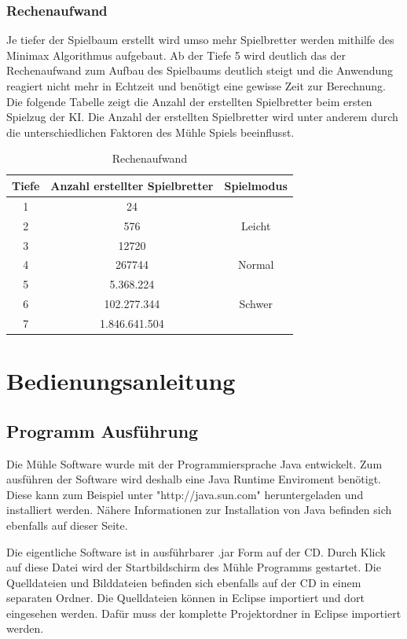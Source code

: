 \documentclass[oneside]{ausarbeitung}
\begin{document}
\subsection{Rechenaufwand}

Je tiefer der Spielbaum erstellt wird umso mehr Spielbretter werden mithilfe des Minimax Algorithmus aufgebaut. Ab der Tiefe 5 wird deutlich das der Rechenaufwand zum Aufbau des Spielbaums deutlich steigt und die Anwendung reagiert nicht mehr in Echtzeit und benötigt eine gewisse Zeit zur Berechnung. Die folgende Tabelle zeigt die Anzahl der erstellten Spielbretter beim ersten Spielzug der KI. Die Anzahl der erstellten Spielbretter wird unter anderem durch die unterschiedlichen Faktoren des Mühle Spiels beeinflusst. 

\begin{table}[H]
	\centering
	\renewcommand{\arraystretch}{2}
	\begin{tabular}{|c||c||c|}
	\hline
	Tiefe & Anzahl erstellter Spielbretter & Spielmodus \\ \hline \hline
	1 & 24 & \\ \hline 
	2 & 576 & Leicht \\ \hline
	3 & 12720 & \\ \hline 
	4 & 267744 & Normal \\ \hline
	5 & 5.368.224 & \\ \hline 
	6 & 102.277.344 & Schwer \\ \hline
	7 & 1.846.641.504 & \\ \hline
	\end{tabular}
	\caption[Rechenaufwand]{Rechenaufwand}
\end{table}

\chapter{Bedienungsanleitung}

\section{Programm Ausführung}

Die Mühle Software wurde mit der Programmiersprache Java entwickelt. Zum ausführen der Software wird deshalb eine Java Runtime Enviroment benötigt. Diese kann zum Beispiel unter "http://java.sun.com" heruntergeladen und installiert werden. Nähere Informationen zur Installation von Java befinden sich ebenfalls auf dieser Seite.

Die eigentliche Software ist in ausführbarer .jar Form auf der CD. Durch Klick auf diese Datei wird der Startbildschirm des Mühle Programms gestartet. Die Quelldateien und Bilddateien befinden sich ebenfalls auf der CD in einem separaten Ordner. Die Quelldateien können in Eclipse importiert und dort eingesehen werden. Dafür muss der komplette Projektordner in Eclipse importiert werden.
\end{document}
